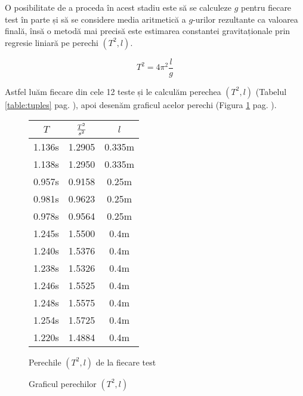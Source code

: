 \documentclass{article}
\begin{document}
O posibilitate de a proceda în acest stadiu este să se calculeze $g$ pentru
fiecare test în parte și să se considere media aritmetică a $g$-urilor rezultante
ca valoarea finală, însă o metodă mai precisă este estimarea constantei gravitaționale
prin regresie liniară pe perechi $(T^2, l)$.

\begin{center}
	\[ T^2 = 4\pi^2\frac{l}{g} \]
\end{center}

Astfel luăm fiecare din cele 12 teste și le calculăm perechea $(T^2, l)$
(Tabelul \ref{table:tuples} pag. \pageref{table:tuples}), apoi desenăm graficul
acelor perechi (Figura \ref{figure:tuples} pag. \pageref{figure:tuples}).
\begin{figure}[h!]
\begin{minipage}[b]{0.4\linewidth}
	\begin{tabular}{|c|c|c|}
		\hline $T$ & $T^2 \over s^2$ & $l$ \\
		\hline 1.136s & 1.2905 & 0.335m \\
		\hline 1.138s & 1.2950 & 0.335m \\
		\hline 0.957s & 0.9158 & 0.25m \\
		\hline 0.981s & 0.9623 & 0.25m \\
		\hline 0.978s & 0.9564 & 0.25m \\
		\hline 1.245s & 1.5500 & 0.4m \\
		\hline 1.240s & 1.5376 & 0.4m \\
		\hline 1.238s & 1.5326 & 0.4m \\
		\hline 1.246s & 1.5525 & 0.4m \\
		\hline 1.248s & 1.5575 & 0.4m \\
		\hline 1.254s & 1.5725 & 0.4m \\
		\hline 1.220s & 1.4884 & 0.4m \\
		\hline
	\end{tabular}
	
	\caption{Perechile $(T^2, l)$ de la fiecare test}
	\label{table:tuples}
\end{minipage}
\begin{minipage}[b]{0.4\linewidth}
\caption{Graficul perechilor $(T^2, l)$}
\label{figure:tuples}
\end{minipage}
\end{figure}
\end{document}
